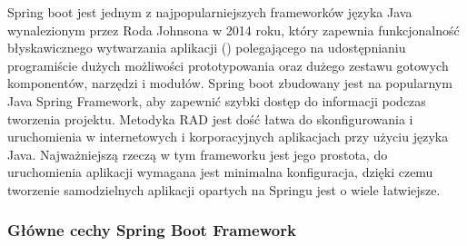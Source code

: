 Spring boot jest jednym z najpopularniejszych frameworków języka Java wynalezionym przez Roda Johnsona w 2014 roku, który zapewnia funkcjonalność błyskawicznego wytwarzania aplikacji () polegającego na udostępnianiu programiście dużych możliwości prototypowania oraz dużego zestawu gotowych komponentów, narzędzi i modułów\cite{RADwiki}. Spring boot zbudowany jest na popularnym Java Spring Framework, aby zapewnić szybki dostęp do informacji podczas tworzenia projektu. Metodyka RAD jest dość łatwa do skonfigurowania i uruchomienia w internetowych i korporacyjnych aplikacjach przy użyciu języka Java. Najważniejszą rzeczą w tym frameworku jest jego prostota, do uruchomienia aplikacji wymagana jest minimalna konfiguracja, dzięki czemu tworzenie samodzielnych aplikacji opartych na Springu jest o wiele łatwiejsze\cite{springbootAnalysis}.

\subsubsection{Główne cechy Spring Boot Framework}

